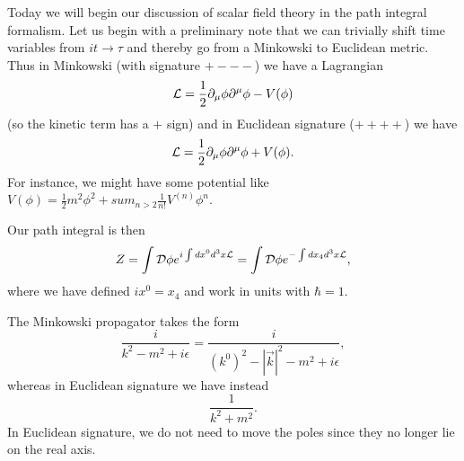 Today we will begin our discussion of scalar field theory in the path integral formalism. Let us begin with a preliminary note that we can trivially shift time variables from $i t\to \tau$ and thereby go from a Minkowski to Euclidean metric. Thus in Minkowski (with signature $+---$) we have a Lagrangian
\begin{equation*}
    \mathcal L=\frac{1}{2} \partial_\mu \phi \partial^\mu \phi -V(\phi)
\end{equation*}
(so the kinetic term has a $+$ sign) and in Euclidean signature ($++++$) we have
\begin{equation*}
    \mathcal L=\frac{1}{2} \partial_\mu \phi \partial^\mu \phi+ V(\phi).
\end{equation*}
For instance, we might have some potential like $V(\phi)=\frac{1}{2} m^2 \phi^2 +sum_{n>2} \frac{1}{n!} V^{(n)} \phi^n$.

Our path integral is then
\begin{equation}
    Z=\int \mathcal{D} \phi e^{i\int dx^0 d^3x \mathcal L}= \int \mathcal{D} \phi e^{-\int dx_4 d^3x \mathcal L},
\end{equation}
where we have defined $ix^0=x_4$ and work in units with $\hbar =1$.

The Minkowski propagator takes the form
\begin{equation}
    \frac{i}{k^2-m^2+i\epsilon} = \frac{i}{(k^0)^2 -|\vec k|^2 -m^2 +i\epsilon},
\end{equation}
whereas in Euclidean signature we have instead
\begin{equation}
    \frac{1}{k^2+m^2}.
\end{equation}
In Euclidean signature, we do not need to move the poles since they no longer lie on the real axis.

